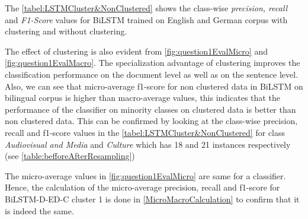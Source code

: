 The \ref{tabel:LSTMCluster&NonClustered} shows the class-wise \textit{precision, recall} and \textit{F1-Score} values for \gls{BiLSTM} trained on English and German corpus with clustering and without clustering.


The effect of clustering is also evident from \ref{fig:question1EvalMicro} and \ref{fig:question1EvalMacro}. The specialization advantage of clustering improves the classification performance on the document level as well as on the sentence level. Also, we can see that micro-average f1-score for non clustered data in \gls{BiLSTM} on bilingual corpus is higher than macro-average values, this indicates that the performance of the classifier on minority classes on clustered data is better than non clustered data. This can be confirmed by looking at the class-wise precision, recall and f1-score values in the \ref{tabel:LSTMCluster&NonClustered} for class \textit{Audiovisual and Media} and \textit{Culture} which has 18 and 21 instances respectively (see \ref{table:befforeAfterResampling})   

The micro-average values in \ref{fig:question1EvalMicro} are same for a classifier. Hence, the calculation of the micro-average precision, recall and f1-score for BiLSTM-D-ED-C cluster 1 is done in \ref{MicroMacroCalculation} to confirm that it is indeed the same. 

